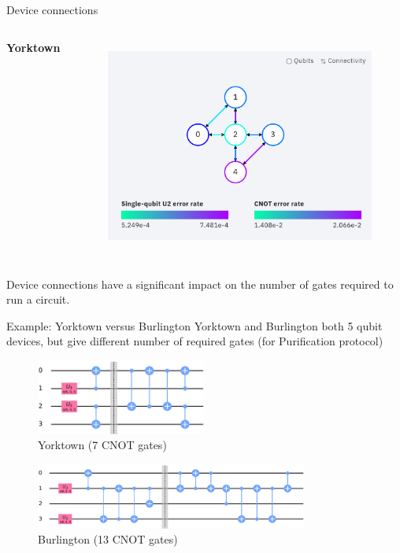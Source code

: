 \begin{frame}{Device connections}
\begin{columns}[T]
   \centering \textbf{Yorktown}
  \begin{figure}[h] \centering
    \includegraphics[width=\textwidth]{images/connection_diagram_ibmqx2.png}
    \label{fig:ibmqx2_connections}
  \end{figure}

\end{columns}
  Device connections have a significant impact on the number of gates required
to run a circuit.
\end{frame}

\begin{frame}{Example: Yorktown versus Burlington}
Yorktown and Burlington both 5 qubit devices, but give different number of
required gates (for Purification protocol)

\begin{figure}[h] \centering
	\includegraphics[width=0.5\textwidth]{images/purification_ibmqx2.png}
	\caption*{\tiny Yorktown (7 CNOT gates)}
	\label{fig:pure_york}
\end{figure}

\begin{figure}[h] \centering
	\includegraphics[width=0.8\textwidth]{images/purification_burlington.png}
	\caption*{\tiny Burlington (13 CNOT gates)}
	\label{fig:pure_burl}
\end{figure}
\end{frame}

